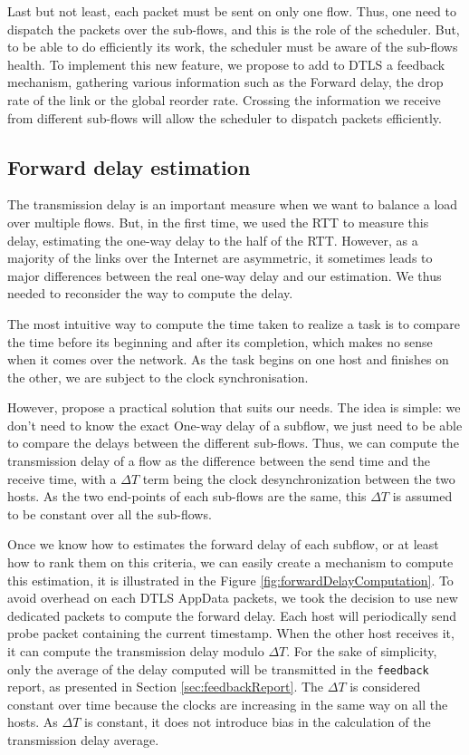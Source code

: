 \documentclass[11pt,a4paper,oldfontcommands]{memoir}
\begin{document}
Last but not least, each packet must be sent on only one flow. Thus, one need to dispatch the packets over the sub-flows, and this is the role of the scheduler. But, to be able to do efficiently its work, the scheduler must be aware of the sub-flows health. To implement this new feature, we propose to add to DTLS a feedback mechanism, gathering various information such as the Forward delay, the drop rate of the link or the global reorder rate. Crossing the information we receive from different sub-flows will allow the scheduler to dispatch packets efficiently.

\subsection{Forward delay estimation}
The transmission delay is an important measure when we want to balance a load over multiple flows. But, in the first time, we used the RTT to measure this delay, estimating the one-way delay to the half of the RTT. However, as a majority of the links over the Internet are asymmetric, it sometimes leads to major differences between the real one-way delay and our estimation. We thus needed to reconsider the way to compute the delay.

The most intuitive way to compute the time taken to realize a task is to compare the time before its beginning and after its completion, which makes no sense when it comes over the network. As the task begins on one host and finishes on the other, we are subject to the clock synchronisation.

However, \cite{song2009estimator} propose a practical solution that suits our needs. The idea is simple: we don't need to know the exact One-way delay of a subflow, we just need to be able to compare the delays between the different sub-flows. Thus, we can compute the transmission delay of a flow as the difference between the send time and the receive time, with a $\Delta T$ term being the clock desynchronization between the two hosts. As the two end-points of each sub-flows are the same, this $\Delta T$ is assumed to be constant over all the sub-flows.

Once we know how to estimates the forward delay of each subflow, or at least how to rank them on this criteria, we can easily create a mechanism to compute this estimation, it is illustrated in the Figure \ref{fig:forwardDelayComputation}. To avoid overhead on each DTLS AppData packets, we took the decision to use new dedicated packets to compute the forward delay. Each host will periodically send probe packet containing the current timestamp. When the other host receives it, it can compute the transmission delay modulo $\Delta T$. For the sake of simplicity, only the average of the delay computed will be transmitted in the \verb!feedback! report, as presented in Section \ref{sec:feedbackReport}. The $\Delta T$ is considered constant over time because the clocks are increasing in the same way on all the hosts. As $\Delta T$ is constant, it does not introduce bias in the calculation of the transmission delay average.
\end{document}
